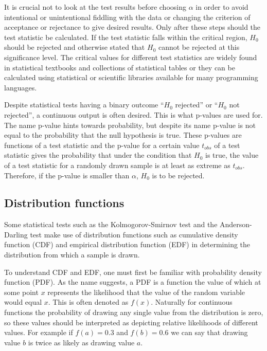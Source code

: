 \documentclass[english, oneside]{HYgradu}
\begin{document}
It is crucial not to look at the test results before choosing $\alpha$ in order to avoid intentional or unintentional fiddling with the data or changing the criterion of acceptance or rejectance to give desired results. Only after these steps should the test statistic be calculated. If the test statistic falls within the critical region, $H_0$ should be rejected and otherwise stated that $H_0$ cannot be rejected at this significance level. The critical values for different test statistics are widely found in statistical textbooks and collections of statistical tables or they can be calculated using statistical or scientific libraries available for many programming languages.

Despite statistical tests having a binary outcome ``$H_0$ rejected'' or ``$H_0$ not rejected'', a continuous output is often desired. This is what p-values are used for. The name p-value hints towards probability, but despite its name p-value is not equal to the probability that the null hypothesis is true. These p-values are functions of a test statistic and the p-value for a certain value $t_{obs}$ of a test statistic gives the probability that under the condition that $H_0$ is true, the value of a test statistic for a randomly drawn sample is at least as extreme as $t_{obs}$. Therefore, if the p-value is smaller than $\alpha$, $H_0$ is to be rejected.

\subsection{Distribution functions} \label{sect:distribution-functions}
Some statistical tests such as the Kolmogorov-Smirnov test and the Anderson-Darling test make use of distribution functions such as cumulative density function (CDF) and empirical distribution function (EDF) in determining the distribution from which a sample is drawn. %

To understand CDF and EDF, one must first be familiar with probability density function (PDF).
As the name suggests, a PDF is a function the value of which at some point $x$ represents the likelihood that the value of the random variable would equal $x$. This is often denoted as $f(x)$. Naturally for continuous functions the probability of drawing any single value from the distribution is zero, so these values should be interpreted as depicting relative likelihoods of different values. For example if $f(a)=0.3$ and $f(b)=0.6$ we can say that drawing value $b$ is twice as likely as drawing value $a$. \citep{htk}
\end{document}
